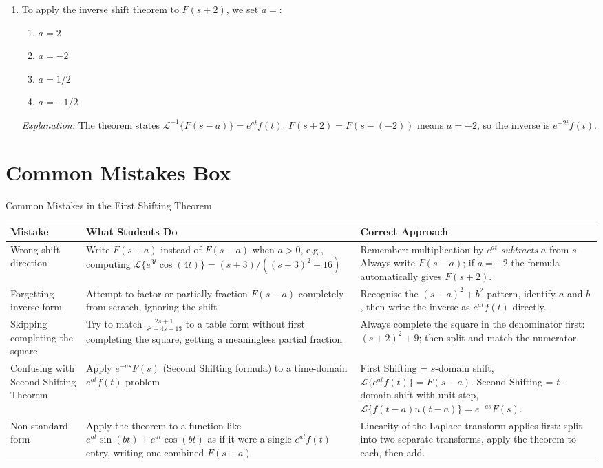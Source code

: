 \documentclass[12pt,a4paper]{article}
\begin{document}
\begin{enumerate}[label=\textbf{\arabic*.}, leftmargin=*, itemsep=1.5em]
\item To apply the inverse shift theorem to $F(s+2)$, we set $a =$:

\begin{enumerate}[label=(\alph*)]
  \item $a = 2$
  \item \textbf{$a = -2$}
  \item $a = 1/2$
  \item $a = -1/2$
\end{enumerate}
\textit{Explanation:} The theorem states $\mathcal{L}^{-1}\{F(s-a)\} = e^{at}f(t)$.
$F(s+2) = F(s-(-2))$ means $a = -2$, so the inverse is $e^{-2t}f(t)$.

\end{enumerate}

\section{Common Mistakes Box}

\begin{mistakebox}{Common Mistakes in the First Shifting Theorem}
\begin{tabular}{@{}p{3.5cm}p{5cm}p{5.5cm}@{}}
\toprule
\textbf{Mistake} & \textbf{What Students Do} & \textbf{Correct Approach} \\
\midrule
Wrong shift direction &
Write $F(s+a)$ instead of $F(s-a)$ when $a > 0$, e.g., computing
$\mathcal{L}\{e^{3t}\cos(4t)\} = (s+3)/((s+3)^2+16)$ &
Remember: multiplication by $e^{at}$ \emph{subtracts} $a$ from $s$.
Always write $F(s-a)$; if $a=-2$ the formula automatically gives $F(s+2)$. \\
\midrule
Forgetting inverse form &
Attempt to factor or partially-fraction $F(s-a)$ completely from scratch, ignoring the shift &
Recognise the $(s-a)^2+b^2$ pattern, identify $a$ and $b$, then write the inverse as
$e^{at}f(t)$ directly. \\
\midrule
Skipping completing the square &
Try to match $\frac{2s+1}{s^2+4s+13}$ to a table form without first completing the square,
getting a meaningless partial fraction &
Always complete the square in the denominator first: $(s+2)^2+9$;
then split and match the numerator. \\
\midrule
Confusing with Second Shifting Theorem &
Apply $e^{-as}F(s)$ (Second Shifting formula) to a time-domain $e^{at}f(t)$ problem &
First Shifting = $s$-domain shift, $\mathcal{L}\{e^{at}f(t)\}=F(s-a)$.
Second Shifting = $t$-domain shift with unit step, $\mathcal{L}\{f(t-a)u(t-a)\}=e^{-as}F(s)$. \\
\midrule
Non-standard form &
Apply the theorem to a function like $e^{at}\sin(bt) + e^{at}\cos(bt)$ as if it were a single
$e^{at}f(t)$ entry, writing one combined $F(s-a)$ &
Linearity of the Laplace transform applies first: split into two separate transforms,
apply the theorem to each, then add. \\
\bottomrule
\end{tabular}
\end{mistakebox}
\end{document}
